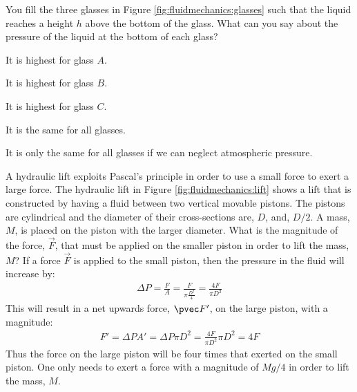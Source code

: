 \begin{checkpoint}
\begin{MCquestion}{You fill the three glasses in Figure \ref{fig:fluidmechanics:glasses} such that the liquid reaches a height $h$ above the bottom of the glass. What can you say about the pressure of the liquid at the bottom of each glass?}
\item It is highest for glass $A$.
\item It is highest for glass $B$.
\item It is highest for glass $C$.
\item It is the same for all glasses. \correct
\item It is only the same for all glasses if we can neglect atmospheric pressure. 
\end{MCquestion}
\end{checkpoint}

\begin{example}{
A hydraulic lift exploits Pascal's principle in order to use a small force to exert a large force. The hydraulic lift in Figure \ref{fig:fluidmechanics:lift} shows a lift that is constructed by having a fluid between two vertical movable pistons. The pistons are cylindrical and the diameter of their cross-sections are, $D$, and, $D/2$. A mass, $M$, is placed on the piston with the larger diameter. What is the magnitude of the force, $\vec F$, that must be applied on the smaller piston in order to lift the mass, $M$?}
If a force $\vec F$ is applied to the small piston, then the pressure in the fluid will increase by:
\begin{align*}
\Delta P = \frac{F}{A}=\frac{F}{\pi \frac{D^2}{4}}=\frac{4F}{\pi D^2}
\end{align*}
This will result in a net upwards force, $\pvec F'$, on the large piston, with a magnitude:
\begin{align*}
F' = \Delta P A' = \Delta P \pi D^2 = \frac{4F}{\pi D^2} \pi D^2 = 4F
\end{align*}
Thus the force on the large piston will be four times that exerted on the small piston. One only needs to exert a force with a magnitude of $Mg/4$ in order to lift the mass, $M$.
\end{example}

